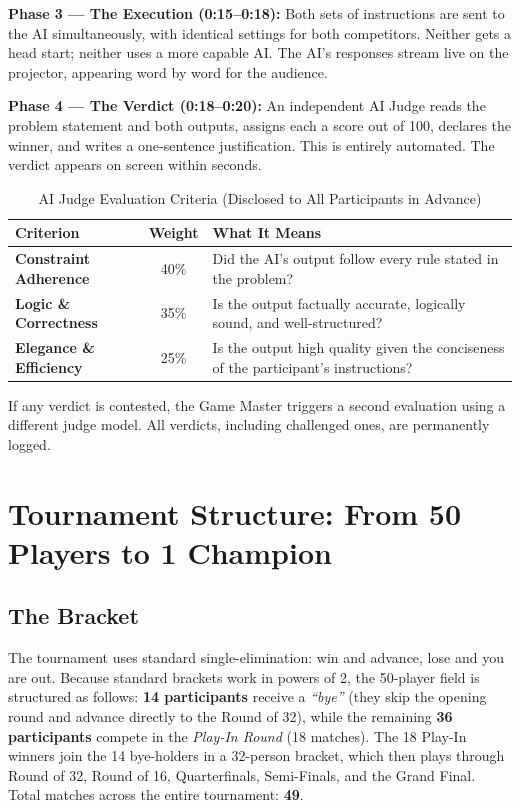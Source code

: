 \documentclass[11pt, a4paper]{article}
\begin{document}
\textbf{Phase 3 --- The Execution (0:15--0:18):} Both sets of instructions are sent to the AI simultaneously, with identical settings for both competitors. Neither gets a head start; neither uses a more capable AI. The AI's responses stream live on the projector, appearing word by word for the audience.

\textbf{Phase 4 --- The Verdict (0:18--0:20):} An independent AI Judge reads the problem statement and both outputs, assigns each a score out of 100, declares the winner, and writes a one-sentence justification. This is entirely automated. The verdict appears on screen within seconds.

\begin{table}[H]
\centering
\renewcommand{\arraystretch}{1.3}
\begin{tabularx}{\textwidth}{>{\bfseries}l c X}
\toprule
Criterion & Weight & What It Means \\
\midrule
Constraint Adherence  & 40\% & Did the AI's output follow every rule stated in the problem? \\
Logic \& Correctness  & 35\% & Is the output factually accurate, logically sound, and well-structured? \\
Elegance \& Efficiency & 25\% & Is the output high quality given the conciseness of the participant's instructions? \\
\bottomrule
\end{tabularx}
\caption{AI Judge Evaluation Criteria (Disclosed to All Participants in Advance)}
\end{table}

If any verdict is contested, the Game Master triggers a second evaluation using a different judge model. All verdicts, including challenged ones, are permanently logged.

\section{Tournament Structure: From 50 Players to 1 Champion}

\subsection{The Bracket}

The tournament uses standard single-elimination: win and advance, lose and you are out. Because standard brackets work in powers of 2, the 50-player field is structured as follows: \textbf{14 participants} receive a \textit{``bye''} (they skip the opening round and advance directly to the Round of 32), while the remaining \textbf{36 participants} compete in the \textit{Play-In Round} (18 matches). The 18 Play-In winners join the 14 bye-holders in a 32-person bracket, which then plays through Round of 32, Round of 16, Quarterfinals, Semi-Finals, and the Grand Final. Total matches across the entire tournament: \textbf{49}.
\end{document}

